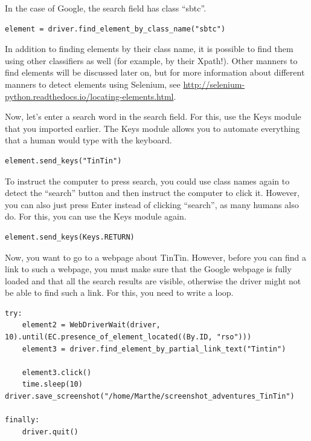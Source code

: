 \documentclass[a4paper,12pt]{book}
\begin{document}
\begin{appendices}
In the case of Google, the search field has class ``sbtc''.  

\begin{lstlisting}
element = driver.find_element_by_class_name("sbtc")
\end{lstlisting}

In addition to finding elements by their class name, it is possible to find them using other classifiers as well (for example, by their Xpath!). Other manners to find elements will be discussed later on, but for more information about different manners to detect elements using Selenium, see
\url{http://selenium-python.readthedocs.io/locating-elements.html}.

Now, let’s enter a search word in the search field. For this, use the Keys module that you imported earlier. The Keys module allows you to automate everything that a human would type with the keyboard. 

\begin{lstlisting}
element.send_keys("TinTin")
\end{lstlisting}

To instruct the computer to press search, you could use class names again to detect the ``search'' button and then instruct the computer to click it. However, you can also just press Enter instead of clicking ``search'', as many humans also do. For this, you can use the Keys module again. 

\begin{lstlisting}
element.send_keys(Keys.RETURN)
\end{lstlisting}

Now, you want to go to a webpage about TinTin. However, before you can find a link to such a webpage, you must make sure that the Google webpage is fully loaded and that all the search results are visible, otherwise the driver might not be able to find such a link. For this, you need to write a loop.

\begin{lstlisting}
try:
    element2 = WebDriverWait(driver, 10).until(EC.presence_of_element_located((By.ID, "rso")))
    element3 = driver.find_element_by_partial_link_text("Tintin")

    element3.click()
    time.sleep(10)	driver.save_screenshot("/home/Marthe/screenshot_adventures_TinTin")

finally:
    driver.quit()
\end{lstlisting} 



\end{appendices}
\end{document}
